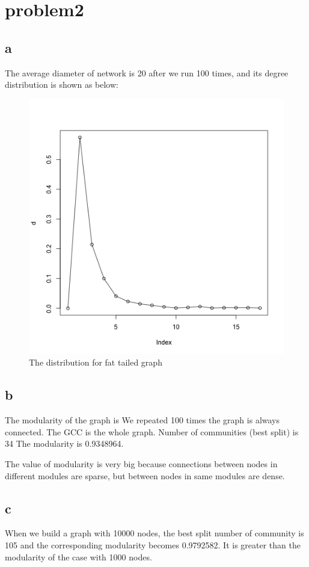 \documentclass{article}
\begin{document}
\section{problem2}
\subsection{a}
The average diameter of network is 20 after we run 100 times, and its degree distribution is shown as below:
\begin{figure}[htbp]
\centering
\includegraphics[width=.6\textwidth]{figure2a.png}
\caption{The distribution for fat tailed graph}
\label{fig:sp_hist}
\end{figure}

\subsection{b}
The modularity of the graph is 
We repeated 100 times the graph is always connected.
The GCC is the whole graph.
Number of communities (best split) is 34
The modularity is 0.9348964.

The value of modularity is very big because connections between nodes in different modules are sparse, but between nodes in same modules are dense. 
\subsection{c}
When we build a graph with 10000 nodes, the best split number of community is 105 and the corresponding modularity becomes 0.9792582.
It is greater than the modularity of the case with 1000 nodes.
\end{document}
